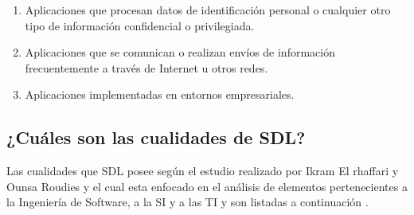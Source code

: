 \documentclass[runningheads,a4paper]{llncs}
\begin{document}
\begin{enumerate}
	\item Aplicaciones que procesan datos de identificación personal o cualquier otro  tipo de información confidencial o privilegiada. 
	\item Aplicaciones que se comunican o realizan envíos de información frecuentemente a través de Internet u otros redes. 
	\item Aplicaciones implementadas en entornos empresariales.
\end{enumerate}

\subsection{¿Cuáles son las cualidades de \gls{SDL}?}
Las cualidades que \gls{SDL} posee según el estudio realizado por Ikram El rhaffari y Ounsa Roudies y el cual esta enfocado en el análisis de elementos pertenecientes a la Ingeniería de \gls{Software}, a la \gls{SI} y a las \gls{TI} y son listadas a continuación \cite{BenchmarkingSDLCLAPS}. 
\end{document}
